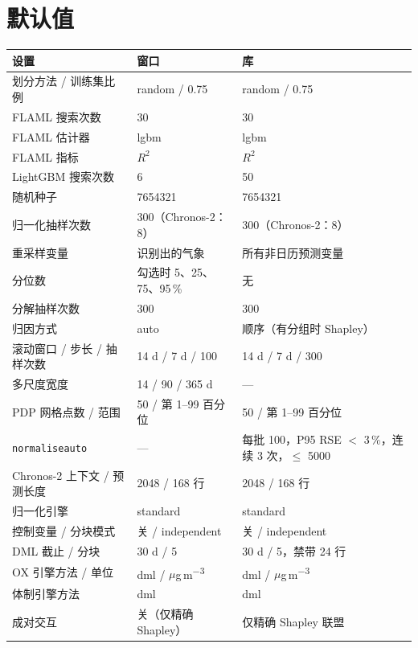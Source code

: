 \documentclass[11pt]{ctexrep}
\newcommand{\codeunderscore}{\textunderscore\allowbreak}
\newcommand{\code}[1]{\texttt{\let\_\codeunderscore #1}}
\newcommand{\ugm}{\ensuremath{\mu}g\,m\textsuperscript{$-3$}}
\begin{document}
\chapter{默认值}\label{app:defaults}
\begin{center}\small
\begin{longtable}{@{}p{4.9cm}p{4.3cm}p{5.8cm}@{}}
\toprule
设置 & 窗口 & 库 \\
\midrule
\endhead
划分方法 / 训练集比例          & random / 0.75 & random / 0.75 \\
FLAML 搜索次数                 & 30 & 30 \\
FLAML 估计器                   & lgbm & lgbm \\
FLAML 指标                     & $R^2$ & $R^2$ \\
LightGBM 搜索次数              & 6 & 50 \\
随机种子                       & 7654321 & 7654321 \\
归一化抽样次数                 & 300（Chronos-2：8） & 300（Chronos-2：8） \\
重采样变量                     & 识别出的气象 & 所有非日历预测变量 \\
分位数                         & 勾选时 5、25、75、95\,\% & 无 \\
分解抽样次数                   & 300 & 300 \\
归因方式                       & auto & 顺序（有分组时 Shapley） \\
滚动窗口 / 步长 / 抽样次数     & 14 d / 7 d / 100 & 14 d / 7 d / 300 \\
多尺度宽度                     & 14 / 90 / 365 d & --- \\
PDP 网格点数 / 范围            & 50 / 第 1--99 百分位 & 50 / 第 1--99 百分位 \\
\code{normalise\_auto}          & --- & 每批 100，P95 RSE $<$ 3\,\%，连续 3 次，$\le$ 5000 \\
Chronos-2 上下文 / 预测长度    & 2048 / 168 行 & 2048 / 168 行 \\
归一化引擎                     & standard & standard \\
控制变量 / 分块模式            & 关 / independent & 关 / independent \\
DML 截止 / 分块                & 30 d / 5 & 30 d / 5，禁带 24 行 \\
OX 引擎方法 / 单位             & dml / \ugm{} & dml / \ugm{} \\
体制引擎方法                   & dml & dml \\
成对交互                       & 关（仅精确 Shapley） & 仅精确 Shapley 联盟 \\

\end{longtable}
\end{center}
\end{document}
